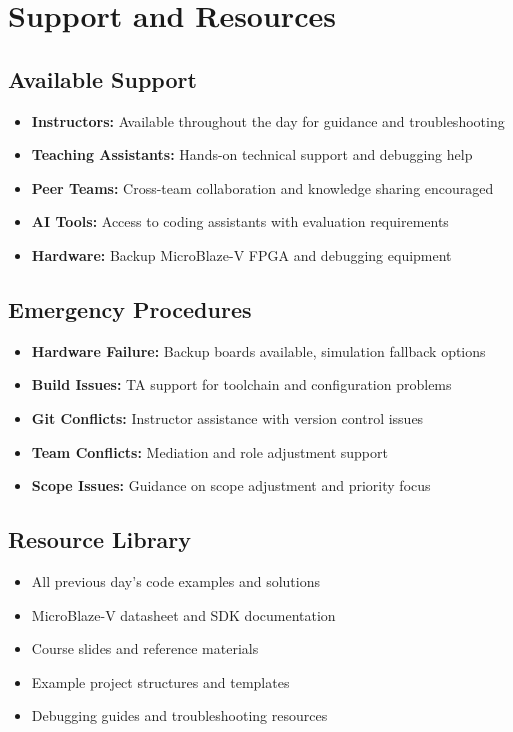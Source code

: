 \documentclass[11pt,a4paper]{article}
\begin{document}
\section{Support and Resources}

\subsection{Available Support}
\begin{itemize}
    \item \textbf{Instructors:} Available throughout the day for guidance and troubleshooting
    \item \textbf{Teaching Assistants:} Hands-on technical support and debugging help
    \item \textbf{Peer Teams:} Cross-team collaboration and knowledge sharing encouraged
    \item \textbf{AI Tools:} Access to coding assistants with evaluation requirements
    \item \textbf{Hardware:} Backup MicroBlaze-V FPGA and debugging equipment
\end{itemize}

\subsection{Emergency Procedures}
\begin{itemize}
    \item \textbf{Hardware Failure:} Backup boards available, simulation fallback options
    \item \textbf{Build Issues:} TA support for toolchain and configuration problems
    \item \textbf{Git Conflicts:} Instructor assistance with version control issues
    \item \textbf{Team Conflicts:} Mediation and role adjustment support
    \item \textbf{Scope Issues:} Guidance on scope adjustment and priority focus
\end{itemize}

\subsection{Resource Library}
\begin{itemize}
    \item All previous day's code examples and solutions
    \item MicroBlaze-V datasheet and SDK documentation
    \item Course slides and reference materials
    \item Example project structures and templates
    \item Debugging guides and troubleshooting resources
\end{itemize}
\end{document}
